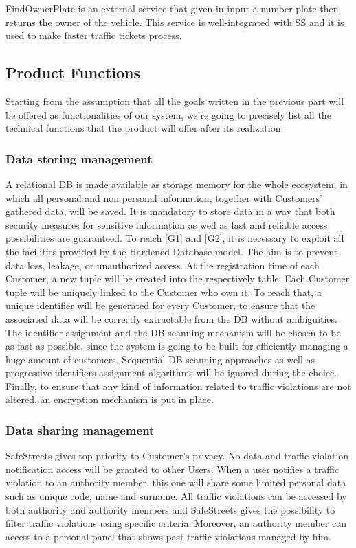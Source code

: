 \documentclass[12pt]{article}
\begin{document}
FindOwnerPlate is an external service that given in input a number plate then returns the owner of the vehicle. This service is well-integrated with SS and it is used to make faster traffic tickets process. 
\subsection{Product Functions}
Starting from the assumption that all the goals written in the previous part will be
offered as functionalities of our system, we’re going to precisely list all the technical functions that the product will offer after its realization. 

\newpage

\subsubsection{Data storing management}
\vspace{5mm}
A relational DB is made available as storage memory for the whole ecosystem, in which all personal and non personal information, together with Customers’ gathered data, will be saved. It is mandatory to store data in a way that both security measures for sensitive information as well as fast and reliable access possibilities are guaranteed. To reach [G1] and [G2], it is necessary to exploit all the facilities provided by the Hardened Database model. The aim is to prevent data loss, leakage, or unauthorized access. At the registration time of each Customer, a new tuple will be created into the respectively table. Each Customer tuple will be uniquely linked to the Customer who own it. To reach that, a unique identifier will be generated for every Customer, to ensure that the associated data will be correctly extractable from the DB without ambiguities. The identifier assignment and the DB scanning mechanism will be chosen to be as fast as possible, since the system is going to be built for efficiently managing a huge amount of customers. Sequential DB scanning approaches as well as progressive identifiers assignment algorithms will be ignored during the choice. Finally, to ensure that any kind of information related to traffic violations are not altered, an encryption mechanism is put in place.

\subsubsection{Data sharing management}
\vspace{2mm}
SafeStreets gives top priority to Customer’s privacy. No data and traffic violation notification access will be granted to other Users. When a user notifies a traffic violation to an authority member, this one will share some limited personal data such as unique code, name and surname. All traffic violations can be accessed by both authority and authority members and SafeStreets gives the possibility to filter traffic violations using specific criteria. Moreover, an authority member can access to a personal panel that shows past traffic violations managed by him. 
\end{document}
